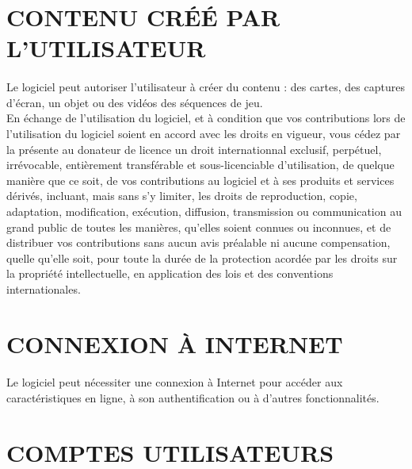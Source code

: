\documentclass[titlepage, 11px, a4paper]{report}
\begin{document}
\section*{CONTENU CRÉÉ PAR L'UTILISATEUR}
\paragraph*{} \hspace{0pt}
Le logiciel peut autoriser l'utilisateur à créer du contenu : 
des cartes, des captures d'écran, un objet ou des vidéos des séquences de jeu. \\
En échange de l'utilisation du logiciel, et à condition que vos contributions
lors de l'utilisation du logiciel soient en accord avec les droits en vigueur, 
vous cédez par la présente au donateur de licence un droit internationnal
exclusif, perpétuel, irrévocable, entièrement transférable et sous-licenciable
d'utilisation, de quelque manière que ce soit, de vos contributions au logiciel
et à ses produits et services dérivés, incluant, mais sans s'y limiter, les
droits de reproduction, copie, adaptation, modification, exécution, diffusion,
transmission ou communication au grand public de toutes les manières, qu'elles
soient connues ou inconnues, et de distribuer vos contributions sans aucun avis
préalable ni aucune compensation, quelle qu'elle soit, pour toute la durée de la protection acordée
par les droits sur la propriété intellectuelle, en application des lois et des
conventions internationales. \\


\section*{CONNEXION À INTERNET}
\paragraph*{} \hspace{0pt}
Le logiciel peut nécessiter une connexion à Internet pour accéder aux
caractéristiques en ligne, à son authentification ou à d'autres fonctionnalités. \\
 

\section*{COMPTES UTILISATEURS}
\paragraph*{} \hspace{0pt}
\end{document}
